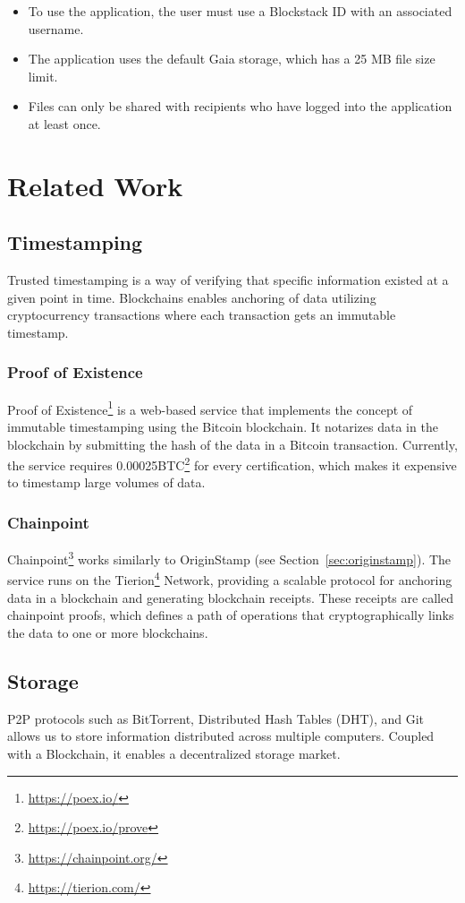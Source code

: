 \begin{itemize}
	\item To use the application, the user must use a Blockstack ID with an associated username.
	\item The application uses the default Gaia storage, which has a 25 MB file size limit.
	\item Files can only be shared with recipients who have logged into the application at least once.
\end{itemize}

\section{Related Work}
\subsection{Timestamping}
Trusted timestamping is a way of verifying that specific information existed at a given point in time. Blockchains enables anchoring of data utilizing cryptocurrency transactions where each transaction gets an immutable timestamp.

\subsubsection{Proof of Existence}
Proof of Existence\footnote{\url{https://poex.io/}} is a web-based service that implements the concept of immutable timestamping using the Bitcoin blockchain. It notarizes data in the blockchain by submitting the hash of the data in a Bitcoin transaction. Currently, the service requires 0.00025BTC\footnote{\url{https://poex.io/prove}} for every certification, which makes it expensive to timestamp large volumes of data.

\subsubsection{Chainpoint}
Chainpoint\footnote{\url{https://chainpoint.org/}} works similarly to OriginStamp (see Section~\ref{sec:originstamp}). The service runs on the Tierion\footnote{\url{https://tierion.com/}} Network, providing a scalable protocol for anchoring data in a blockchain and generating blockchain receipts. These receipts are called chainpoint proofs, which defines a path of operations that cryptographically links the data to one or more blockchains.

\subsection{Storage}
P2P protocols such as BitTorrent\cite{cohen2008bittorrent}, Distributed Hash Tables (DHT), and Git allows us to store information distributed across multiple computers. Coupled with a Blockchain, it enables a decentralized storage market.

